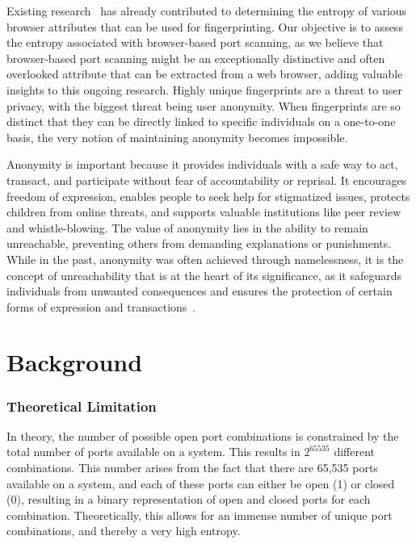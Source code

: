 Existing research~ has already contributed to determining the entropy of various browser attributes that can be used for fingerprinting. Our objective is to assess the entropy associated with browser-based port scanning, as we believe that browser-based port scanning might be an exceptionally distinctive and often overlooked attribute that can be extracted from a web browser, adding valuable insights to this ongoing research.
Highly unique fingerprints are a threat to user privacy, with the biggest threat being user anonymity. When fingerprints are so distinct that they can be directly linked to specific individuals on a one-to-one basis, the very notion of maintaining anonymity becomes impossible.

Anonymity is important because it provides individuals with a safe way to act, transact, and participate without fear of accountability or reprisal. It encourages freedom of expression, enables people to seek help for stigmatized issues, protects children from online threats, and supports valuable institutions like peer review and whistle-blowing. 
The value of anonymity lies in the ability to remain unreachable, preventing others from demanding explanations or punishments. While in the past, anonymity was often achieved through namelessness, it is the concept of unreachability that is at the heart of its significance, as it safeguards individuals from unwanted consequences and ensures the protection of certain forms of expression and transactions~.

\section{Background}

\subsubsection{Theoretical Limitation}

In theory, the number of possible open port combinations is constrained by the total number of ports available on a system. This results in $2^{65535}$ different combinations.
This number arises from the fact that there are 65,535 ports available on a system, and each of these ports can either be open (1) or closed (0), resulting in a binary representation of open and closed ports for each combination. 
Theoretically, this allows for an immense number of unique port combinations, and thereby a very high entropy.


